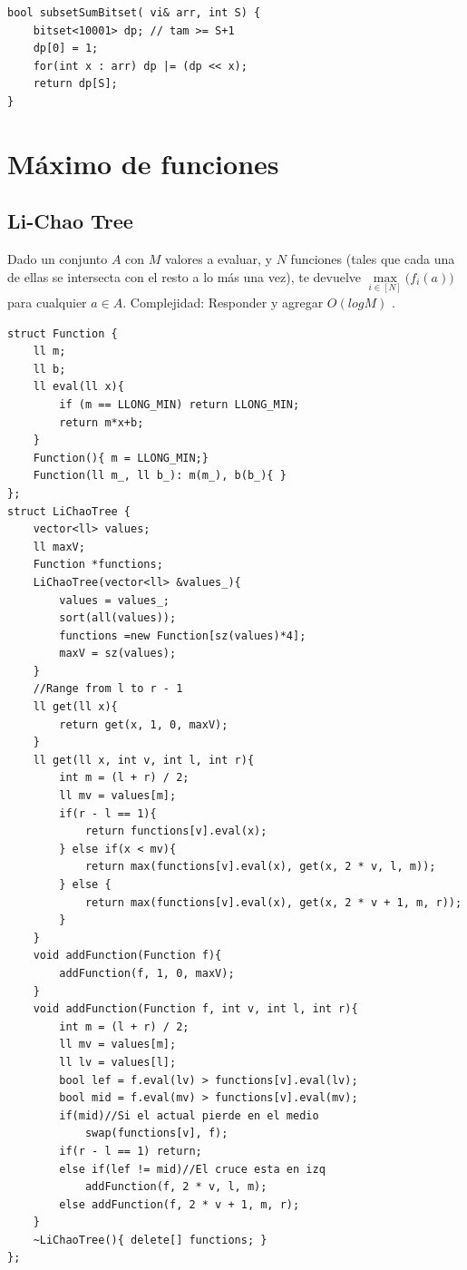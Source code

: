 \documentclass[10pt,spanish,mexico]{article}
\numberwithin{equation}{section}
\begin{document}
\begin{multicols}{2}
\begin{verbatim}
bool subsetSumBitset( vi& arr, int S) {
    bitset<10001> dp; // tam >= S+1
    dp[0] = 1;
    for(int x : arr) dp |= (dp << x);
    return dp[S];
}
\end{verbatim}

\vspace{-1.2\baselineskip}
\hrulefill
\section{Máximo de funciones}

\subsection{Li-Chao Tree}
Dado un conjunto $A$ con $M$ valores a evaluar, y $N$ funciones (tales que cada una de ellas se intersecta con el resto a lo más una vez), te devuelve $\max\limits_{i\in [N]} \big(f_i(a)\big)$ para cualquier  $a\in A$. Complejidad: Responder y agregar $O(log M)$ .

\begin{verbatim}
struct Function {
    ll m;
    ll b;
    ll eval(ll x){
        if (m == LLONG_MIN) return LLONG_MIN;
        return m*x+b;
    }
    Function(){ m = LLONG_MIN;}
    Function(ll m_, ll b_): m(m_), b(b_){ }
};
struct LiChaoTree {
    vector<ll> values;
    ll maxV;
    Function *functions;
    LiChaoTree(vector<ll> &values_){
        values = values_;
        sort(all(values));
        functions =new Function[sz(values)*4];
        maxV = sz(values);
    }
    //Range from l to r - 1
    ll get(ll x){
        return get(x, 1, 0, maxV);
    }
    ll get(ll x, int v, int l, int r){
        int m = (l + r) / 2;
        ll mv = values[m];
        if(r - l == 1){
            return functions[v].eval(x);
        } else if(x < mv){
            return max(functions[v].eval(x), get(x, 2 * v, l, m));
        } else {
            return max(functions[v].eval(x), get(x, 2 * v + 1, m, r));
        }
    }
    void addFunction(Function f){
        addFunction(f, 1, 0, maxV);
    }
    void addFunction(Function f, int v, int l, int r){
        int m = (l + r) / 2;
        ll mv = values[m];
        ll lv = values[l];
        bool lef = f.eval(lv) > functions[v].eval(lv);
        bool mid = f.eval(mv) > functions[v].eval(mv);
        if(mid)//Si el actual pierde en el medio
            swap(functions[v], f);
        if(r - l == 1) return;
        else if(lef != mid)//El cruce esta en izq
            addFunction(f, 2 * v, l, m);
        else addFunction(f, 2 * v + 1, m, r);
    }
    ~LiChaoTree(){ delete[] functions; }
};
\end{verbatim}
\vspace{-1.2\baselineskip}
\hrulefill

\end{multicols}

\end{document}
